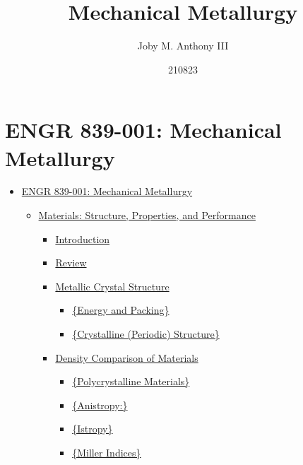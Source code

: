 \documentclass[
]{article}
\title{Mechanical Metallurgy}
\author{Joby M. Anthony III}
\date{210823}
\providecommand{\tightlist}{%
  \setlength{\itemsep}{0pt}\setlength{\parskip}{0pt}}
\begin{document}
\maketitle

\hypertarget{engr-839-001-mechanical-metallurgy}{%
\section{ENGR 839-001: Mechanical
Metallurgy}\label{engr-839-001-mechanical-metallurgy}}

\begin{itemize}
\tightlist
\item
  \protect\hyperlink{engr-839-001-mechanical-metallurgy}{ENGR 839-001:
  Mechanical Metallurgy}

  \begin{itemize}
  \tightlist
  \item
    \protect\hyperlink{materials-structure-properties-and-performance}{Materials:
    Structure, Properties, and Performance}

    \begin{itemize}
    \tightlist
    \item
      \protect\hyperlink{introduction}{Introduction}
    \item
      \protect\hyperlink{review}{Review}
    \item
      \protect\hyperlink{metallic-crystal-structure}{Metallic Crystal
      Structure}

      \begin{itemize}
      \tightlist
      \item
        \protect\hyperlink{energy-and-packing}{\{Energy and Packing\}}
      \item
        \protect\hyperlink{crystalline-periodic-structure}{\{Crystalline
        (Periodic) Structure\}}
      \end{itemize}
    \item
      \protect\hyperlink{density-comparison-of-materials}{Density
      Comparison of Materials}

      \begin{itemize}
      \tightlist
      \item
        \protect\hyperlink{polycrystalline-materials}{\{Polycrystalline
        Materials\}}
      \item
        \protect\hyperlink{anistropy}{\{Anistropy:\}}
      \item
        \protect\hyperlink{istropy}{\{Istropy\}}
      \item
        \protect\hyperlink{miller-indices}{\{Miller Indices\}}


\end{itemize}
\end{itemize}
\end{itemize}
\end{itemize}
\end{document}
